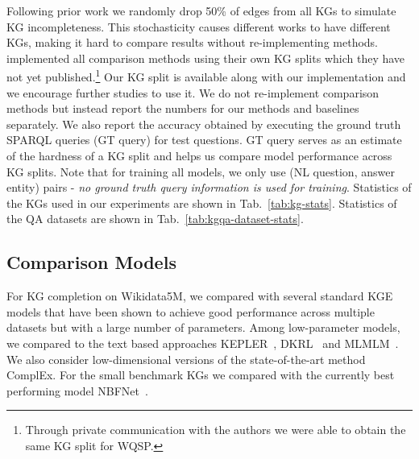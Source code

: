 \documentclass[11pt]{article}
\makeatletter
\renewcommand\:{\colon} \newcommand{\sset}[1]{\left\{\,#1\,\right\}} \newcommand{\ssets}[1]{\left\{#1\right\}} \newcommand{\ssetn}[1]{\{\,#1\,\}}
\newcommand\footnoteref[1]{\protected@xdef\@thefnmark{\ref{#1}}\@footnotemark}
\makeatother
\begin{document}
Following prior work \cite{sun2019pullnet} we randomly drop 50\% of edges from all KGs to simulate KG incompleteness. 
This stochasticity causes different works to have different KGs, making it hard to compare results without re-implementing methods. 
\citet{ren2021lego} implemented all comparison methods using their own KG splits which they have not yet published.\footnote{Through private communication with the authors we were able to obtain the same KG split for WQSP.}
Our KG split is available along with our implementation\footnoteref{resources-note} and we encourage further studies to use it. 
We do not re-implement comparison methods but instead report the numbers for our methods and baselines separately.
We also report the accuracy obtained by executing the ground truth SPARQL queries (GT query) for test questions.
GT query serves as an estimate of the hardness of a KG split
and  helps us compare model performance across KG splits.
Note that for training all models, we only use (NL question, answer entity) pairs - \textit{no ground truth query information is used for training}.
Statistics of the KGs used in our experiments are shown in Tab.~\ref{tab:kg-stats}. Statistics of the QA datasets are shown in Tab.~\ref{tab:kgqa-dataset-stats}.





\subsection{Comparison Models}
\label{sec:baselines}
For KG completion on Wikidata5M, we compared with several standard KGE models that have been shown to achieve good performance across multiple datasets \cite{ruffinelli2020you} but with a large number of parameters. Among low-parameter models, we compared to the text based approaches KEPLER~\cite{wang2021KEPLER}, DKRL~\cite{Xie_Liu_Jia_Luan_Sun_2016} and MLMLM~\cite{clouatre-etal-2021-mlmlm}. 
We also consider low-dimensional versions of the state-of-the-art method ComplEx.
For the small benchmark KGs we compared with the currently best performing model NBFNet~\cite{nbfnet}.
\end{document}
